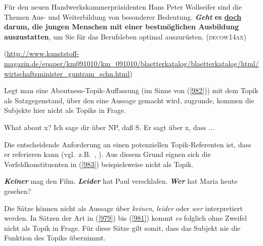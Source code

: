 {\begin{exe}
	\ex\label{981}
	{\sloppy
	Für den neuen Handwerkskammerpräsidenten Hans Peter Wollseifer sind die Themen Aus- und Wei\-terbildung von besonderer Bedeutung.
	\textbf{\textit{Geht} es \ul{doch} darum, die jungen Menschen mit einer bestmöglichen Ausbildung auszustatten}, um Sie für das Berufsleben 			optimal auszurüsten.}
	\newline\hbox{}\hfill\hbox{\scshape(decow14ax)}
	\begin{sloppypar}
	{\scriptsize(\url{http://www.kunststoff-magazin.de/epaper/km091010/km\_091010/blaetterkatalog/blaetterkatalog/html/wirtschaftsminister\_guntram\_schn.html})}\end{sloppypar}
\end{exe}
Legt man eine  Aboutness-Topik-Auffassung (im Sinne von (\ref{982})) mit dem Topik als Satzgegenstand, über den eine Aussage gemacht wird, zugrunde, kommen die Subjekte hier nicht als Topiks in Frage.

\begin{exe}
	\ex\label{982} 
		\begin{xlist}	
			\ex\label{982a} What about x?
			\hfill\hbox{\citet[32]{Gundel1977}}
			\ex\label{982b} Ich sage dir über NP, daß S.
			\hfill\hbox{\citet[68--69]{Sgall1974}}
			\ex\label{982c} Er sagt über x, dass ...
			\hfill\hbox{\citet[65]{Reinhart1981}}
		\end{xlist}
\end{exe}
Die entscheidende Anforderung an einen potenziellen Topik-Referenten  ist, dass er referieren kann (vgl.\ z.B.\ \citealt{Reinhart1981}, \citealt[331]{Frey2007}). Aus diesem Grund eignen sich die Vorfeldkonstituenten in (\ref{983}) beispielsweise nicht als Topik.

\begin{exe}
	\ex\label{983} 
		\begin{xlist}	
			\ex\label{983a} \textbf{\textit{Keiner}} mag den Film.
			\ex\label{983b} \textbf{\textit{Leider}} hat Paul verschlafen.
			\ex\label{983c} \textbf{\textit{Wer}} hat Maria heute gesehen?
			\hfill\hbox{\citet[331]{Frey2007}}
		\end{xlist}
\end{exe}
Die Sätze können nicht als Aussage über \textit{keinen}, \textit{leider} oder \textit{wer} interpretiert werden. In Sätzen der Art in (\ref{979}) bis (\ref{981}) kommt \textit{es} folglich ohne Zweifel nicht als Topik in Frage. Für diese Sätze gilt somit, dass das Subjekt nie die Funktion des Topiks übernimmt.

}
